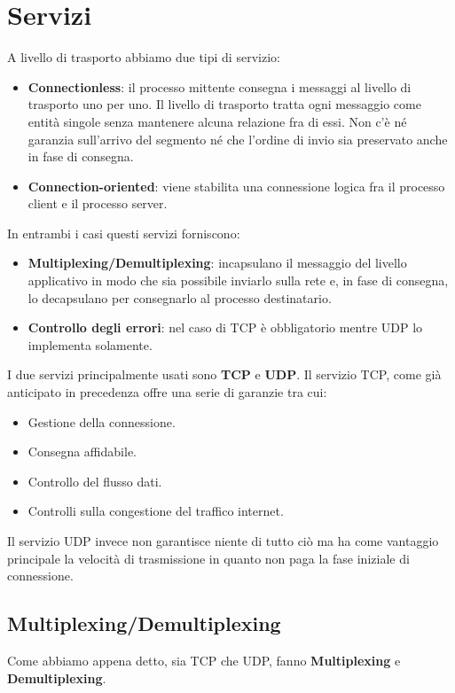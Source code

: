 \section{Servizi}
A livello di trasporto abbiamo due tipi di servizio:
\begin{itemize}
	\item \textbf{Connectionless}: il processo mittente consegna i messaggi al livello di trasporto
	      uno per uno. Il livello di trasporto tratta ogni messaggio come entità singole senza
	      mantenere alcuna relazione fra di essi. Non c'è né garanzia sull'arrivo del segmento né
	      che l'ordine di invio sia preservato anche in fase di consegna.
	\item \textbf{Connection-oriented}: viene stabilita una connessione logica fra il processo
	      client e il processo server.
\end{itemize}
In entrambi i casi questi servizi forniscono:
\begin{itemize}
	\item \textbf{Multiplexing/Demultiplexing}: incapsulano il messaggio del livello applicativo in
	      modo che sia possibile inviarlo sulla rete e, in fase di consegna, lo decapsulano per
	      consegnarlo al processo destinatario.
	\item \textbf{Controllo degli errori}: nel caso di TCP è obbligatorio mentre UDP lo implementa
	      solamente.
\end{itemize}
I due servizi principalmente usati sono \textbf{TCP} e \textbf{UDP}. Il servizio TCP, come già
anticipato in precedenza offre una serie di garanzie tra cui:
\begin{itemize}
	\item Gestione della connessione.
	\item Consegna affidabile.
	\item Controllo del flusso dati.
	\item Controlli sulla congestione del traffico internet.
\end{itemize}
Il servizio UDP invece non garantisce niente di tutto ciò ma ha come vantaggio principale la
velocità di trasmissione in quanto non paga la fase iniziale di connessione.

\subsection{Multiplexing/Demultiplexing}
Come abbiamo appena detto, sia TCP che UDP, fanno \textbf{Multiplexing} e \textbf{Demultiplexing}.

